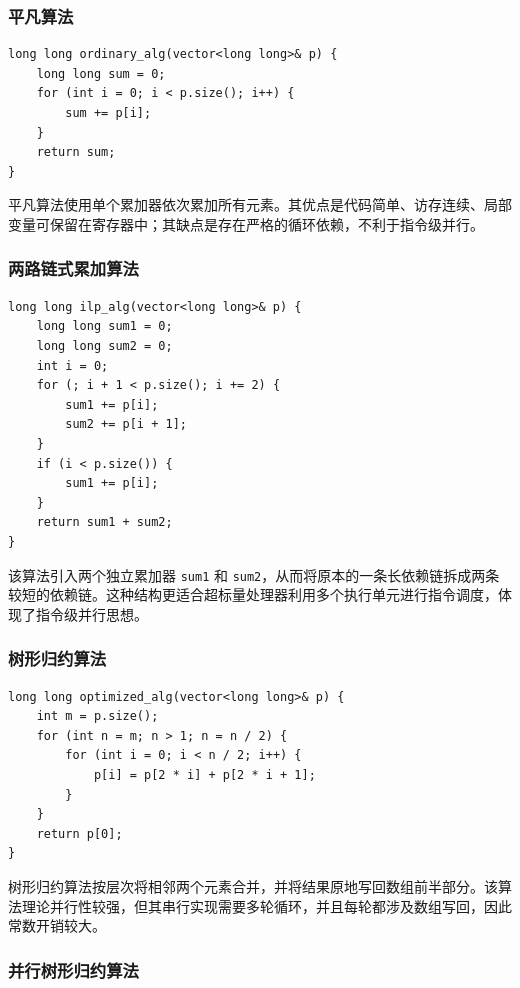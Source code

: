 \documentclass[a4paper,12pt]{ctexart}
\begin{document}
\subsubsection{平凡算法}

\begin{lstlisting}
long long ordinary_alg(vector<long long>& p) {
    long long sum = 0;
    for (int i = 0; i < p.size(); i++) {
        sum += p[i];
    }
    return sum;
}
\end{lstlisting}

平凡算法使用单个累加器依次累加所有元素。其优点是代码简单、访存连续、局部变量可保留在寄存器中；其缺点是存在严格的循环依赖，不利于指令级并行。

\subsubsection{两路链式累加算法}

\begin{lstlisting}
long long ilp_alg(vector<long long>& p) {
    long long sum1 = 0;
    long long sum2 = 0;
    int i = 0;
    for (; i + 1 < p.size(); i += 2) {
        sum1 += p[i];
        sum2 += p[i + 1];
    }
    if (i < p.size()) {
        sum1 += p[i];
    }
    return sum1 + sum2;
}
\end{lstlisting}

该算法引入两个独立累加器 \texttt{sum1} 和 \texttt{sum2}，从而将原本的一条长依赖链拆成两条较短的依赖链。这种结构更适合超标量处理器利用多个执行单元进行指令调度，体现了指令级并行思想。

\subsubsection{树形归约算法}

\begin{lstlisting}
long long optimized_alg(vector<long long>& p) {
    int m = p.size();
    for (int n = m; n > 1; n = n / 2) {
        for (int i = 0; i < n / 2; i++) {
            p[i] = p[2 * i] + p[2 * i + 1];
        }
    }
    return p[0];
}
\end{lstlisting}

树形归约算法按层次将相邻两个元素合并，并将结果原地写回数组前半部分。该算法理论并行性较强，但其串行实现需要多轮循环，并且每轮都涉及数组写回，因此常数开销较大。

\subsubsection{并行树形归约算法}
\end{document}
